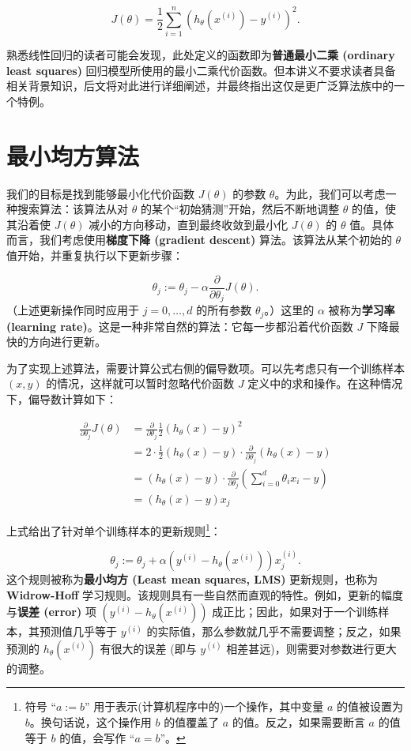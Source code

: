 \[
    J(\theta) = \frac{1}{2} \sum_{i=1}^n (h_\theta(x^{(i)}) - y^{(i)})^2.
\]

熟悉线性回归的读者可能会发现，此处定义的函数即为\textbf{普通最小二乘 (ordinary least squares)} 回归模型所使用的最小二乘代价函数。但本讲义不要求读者具备相关背景知识，后文将对此进行详细阐述，并最终指出这仅是更广泛算法族中的一个特例。


\section{最小均方算法}

我们的目标是找到能够最小化代价函数 $J(\theta)$ 的参数 $\theta$。为此，我们可以考虑一种搜索算法：该算法从对 $\theta$ 的某个“初始猜测”开始，然后不断地调整 $\theta$ 的值，使其沿着使 $J(\theta)$ 减小的方向移动，直到最终收敛到最小化 $J(\theta)$ 的 $\theta$ 值。具体而言，我们考虑使用\textbf{梯度下降 (gradient descent)} 算法。该算法从某个初始的 $\theta$ 值开始，并重复执行以下更新步骤：

\[
    \theta_j := \theta_j - \alpha \frac{\partial}{\partial\theta_j} J(\theta).
\]
（上述更新操作同时应用于 $j = 0, \dots, d$ 的所有参数 $\theta_j$。）这里的 $\alpha$ 被称为\textbf{学习率 (learning rate)}。这是一种非常自然的算法：它每一步都沿着代价函数 $J$ 下降最快的方向进行更新。

为了实现上述算法，需要计算公式右侧的偏导数项。可以先考虑只有一个训练样本 $(x, y)$ 的情况，这样就可以暂时忽略代价函数 $J$ 定义中的求和操作。在这种情况下，偏导数计算如下：

\[
    \begin{aligned}
    \frac{\partial}{\partial\theta_j} J(\theta) &= \frac{\partial}{\partial\theta_j} \frac{1}{2} (h_\theta(x) - y)^2 \\
    &= 2 \cdot \frac{1}{2} (h_\theta(x) - y) \cdot \frac{\partial}{\partial\theta_j} (h_\theta(x) - y) \\
    &= (h_\theta(x) - y) \cdot \frac{\partial}{\partial\theta_j} \left( \sum_{i=0}^d \theta_i x_i - y \right) \\
    &= (h_\theta(x) - y) x_j
    \end{aligned}
\]

上式给出了针对单个训练样本的更新规则\footnote{符号 “$a := b$” 用于表示(计算机程序中的)一个操作，其中变量 $a$ 的值被设置为 $b$。换句话说，这个操作用 $b$ 的值覆盖了 $a$ 的值。反之，如果需要断言 $a$ 的值等于 $b$ 的值，会写作 “$a = b$”。}：

\[
    \theta_j := \theta_j + \alpha (y^{(i)} - h_\theta(x^{(i)})) x_j^{(i)}.
\]
这个规则被称为\textbf{最小均方 (Least mean squares, LMS)} 更新规则，也称为 \textbf{Widrow-Hoff} 学习规则。该规则具有一些自然而直观的特性。例如，更新的幅度与\textbf{误差 (error)} 项 $(y^{(i)} - h_\theta(x^{(i)}))$ 成正比；因此，如果对于一个训练样本，其预测值几乎等于 $y^{(i)}$ 的实际值，那么参数就几乎不需要调整；反之，如果预测的 $h_\theta(x^{(i)})$ 有很大的误差 (即与 $y^{(i)}$ 相差甚远)，则需要对参数进行更大的调整。

